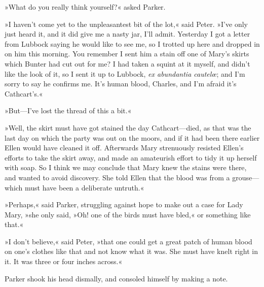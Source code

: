 »What do you really think yourself?« asked Parker.

»I haven't come yet to the unpleasantest bit of the lot,« said Peter. »I've only just heard it, and it did give me a nasty jar, I'll admit.  Yesterday I got a letter from Lubbock saying he would like to see me, so I trotted up here and dropped in on him this morning. You remember I sent him a stain off one of Mary's skirts which Bunter had cut out for me? I had taken a squint at it myself, and didn't like the look of it, so I sent it up to Lubbock, \textit{ex abundantia cautelœ}; and I'm sorry to say he confirms me. It's human blood, Charles, and I'm afraid it's Cathcart's.«

»But—I've lost the thread of this a bit.«

»Well, the skirt must have got stained the day Cathcart—died, as that was the last day on which the party was out on the moors, and if it had been there earlier Ellen would have cleaned it off. Afterwards Mary strenuously resisted Ellen's efforts to take the skirt away, and made an amateurish effort to tidy it up herself with soap. So I think we may conclude that Mary knew the stains were there, and wanted to avoid discovery. She told Ellen that the blood was from a grouse—which must have been a deliberate untruth.«

»Perhaps,« said Parker, struggling against hope to make out a case for Lady Mary, »she only said, »Oh! one of the birds must have bled,« or something like that.«

»I don't believe,« said Peter, »that one could get a great patch of human blood on one's clothes like that and not know what it was. She must have knelt right in it. It was three or four inches across.«

Parker shook his head dismally, and consoled himself by making a note.

